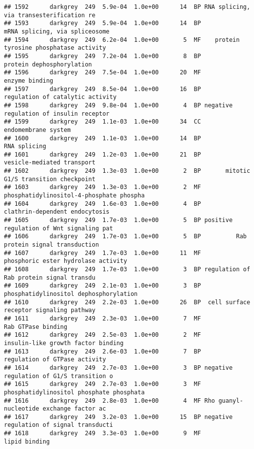\documentclass[]{article}
\begin{document}
\begin{verbatim}
## 1592      darkgrey  249  5.9e-04  1.0e+00      14  BP RNA splicing, via transesterification re
## 1593      darkgrey  249  5.9e-04  1.0e+00      14  BP           mRNA splicing, via spliceosome
## 1594      darkgrey  249  6.2e-04  1.0e+00       5  MF    protein tyrosine phosphatase activity
## 1595      darkgrey  249  7.2e-04  1.0e+00       8  BP                protein dephosphorylation
## 1596      darkgrey  249  7.5e-04  1.0e+00      20  MF                           enzyme binding
## 1597      darkgrey  249  8.5e-04  1.0e+00      16  BP         regulation of catalytic activity
## 1598      darkgrey  249  9.8e-04  1.0e+00       4  BP negative regulation of insulin receptor 
## 1599      darkgrey  249  1.1e-03  1.0e+00      34  CC                      endomembrane system
## 1600      darkgrey  249  1.1e-03  1.0e+00      14  BP                             RNA splicing
## 1601      darkgrey  249  1.2e-03  1.0e+00      21  BP               vesicle-mediated transport
## 1602      darkgrey  249  1.3e-03  1.0e+00       2  BP       mitotic G1/S transition checkpoint
## 1603      darkgrey  249  1.3e-03  1.0e+00       2  MF phosphatidylinositol-4-phosphate phospha
## 1604      darkgrey  249  1.6e-03  1.0e+00       4  BP           clathrin-dependent endocytosis
## 1605      darkgrey  249  1.7e-03  1.0e+00       5  BP positive regulation of Wnt signaling pat
## 1606      darkgrey  249  1.7e-03  1.0e+00       5  BP          Rab protein signal transduction
## 1607      darkgrey  249  1.7e-03  1.0e+00      11  MF      phosphoric ester hydrolase activity
## 1608      darkgrey  249  1.7e-03  1.0e+00       3  BP regulation of Rab protein signal transdu
## 1609      darkgrey  249  2.1e-03  1.0e+00       3  BP   phosphatidylinositol dephosphorylation
## 1610      darkgrey  249  2.2e-03  1.0e+00      26  BP  cell surface receptor signaling pathway
## 1611      darkgrey  249  2.3e-03  1.0e+00       7  MF                       Rab GTPase binding
## 1612      darkgrey  249  2.5e-03  1.0e+00       2  MF       insulin-like growth factor binding
## 1613      darkgrey  249  2.6e-03  1.0e+00       7  BP            regulation of GTPase activity
## 1614      darkgrey  249  2.7e-03  1.0e+00       3  BP negative regulation of G1/S transition o
## 1615      darkgrey  249  2.7e-03  1.0e+00       3  MF phosphatidylinositol phosphate phosphata
## 1616      darkgrey  249  2.8e-03  1.0e+00       4  MF Rho guanyl-nucleotide exchange factor ac
## 1617      darkgrey  249  3.2e-03  1.0e+00      15  BP negative regulation of signal transducti
## 1618      darkgrey  249  3.3e-03  1.0e+00       9  MF                            lipid binding

\end{verbatim}
\end{document}
